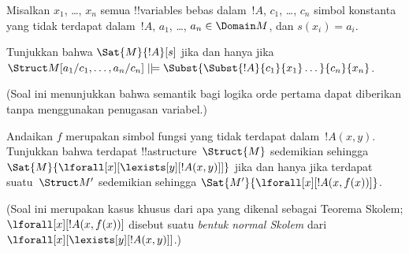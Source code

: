 \documentclass[../../../include/open-logic-section]{subfiles}
\begin{document}
\begin{prob}
\begin{enumerate}

\end{enumerate}
Misalkan $x_1$, \dots, $x_n$ semua !!{variable}s bebas dalam~$!A$,
$c_1$, \dots, $c_n$ simbol konstanta yang tidak terdapat dalam~$!A$,
$a_1$, \dots, $a_n \in \Domain M$, dan $s(x_i) = a_i$.

Tunjukkan bahwa $\Sat{M}{!A}[s]$ jika dan hanya jika
$\Struct M[a_1/c_1,\dots,a_n/c_n]
\VDash \Subst{\Subst{!A}{c_1}{x_1}\dots}{c_n}{x_n}$.

(Soal ini menunjukkan bahwa semantik bagi logika orde pertama dapat
diberikan tanpa menggunakan penugasan variabel.)
\end{prob}

\begin{prob}
Andaikan $f$ merupakan simbol fungsi yang tidak terdapat dalam~$!A(x,y)$.
Tunjukkan bahwa terdapat !!a{structure}~$\Struct{M}$ sedemikian sehingga
$\Sat{M}{\lforall[x][\lexists[y][!A(x,y)]]}$ jika dan hanya jika terdapat
suatu~$\Struct M'$ sedemikian sehingga
$\Sat{M'}{\lforall[x][!A(x,f(x))]}$.

(Soal ini merupakan kasus khusus dari apa yang dikenal sebagai Teorema
Skolem; $\lforall[x][!A(x,f(x))]$ disebut suatu \emph{bentuk normal Skolem}
dari $\lforall[x][\lexists[y][!A(x,y)]]$.)
\end{prob}
\end{document}
